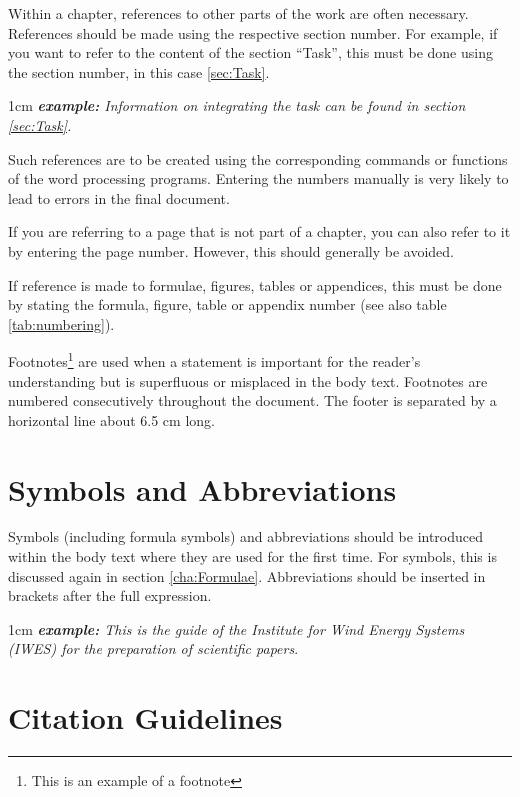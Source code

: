 Within a chapter, references to other parts of the work are often necessary. References should be made using the respective section number. For example, if you want to refer to the content of the section "`Task"', this must be done using the section number, in this case \ref{sec:Task}. 

\begin{addmargin}[1cm]{1cm}
	\textit{\textbf{example:} Information on integrating the task can be found in section \ref{sec:Task}.}
\end{addmargin}

Such references are to be created using the corresponding commands or functions of the word processing programs. Entering the numbers manually is very likely to lead to errors in the final document. 

If you are referring to a page that is not part of a chapter, you can also refer to it by entering the page number. However, this should generally be avoided.

If reference is made to formulae, figures, tables or appendices, this must be done by stating the formula, figure, table or appendix number (see also table \ref{tab:numbering}).

Footnotes\footnote{This is an example of a footnote} are used when a statement is important for the reader's understanding but is superfluous or misplaced in the body text. Footnotes are numbered consecutively throughout the document. The footer is separated by a horizontal line about 6.5 cm long.



\section{Symbols and Abbreviations}
\label{sec:Abbrev}

Symbols (including formula symbols) and abbreviations should be introduced within the body text where they are used for the first time. For symbols, this is discussed again in section \ref{cha:Formulae}. Abbreviations should be inserted in brackets after the full expression. 

\begin{addmargin}[1cm]{1cm}
	\textit{\textbf{example:} This is the guide of the Institute for Wind Energy Systems (IWES) for the preparation of scientific papers}.
\end{addmargin}

\section{Citation Guidelines}
\label{sec:Citation}


